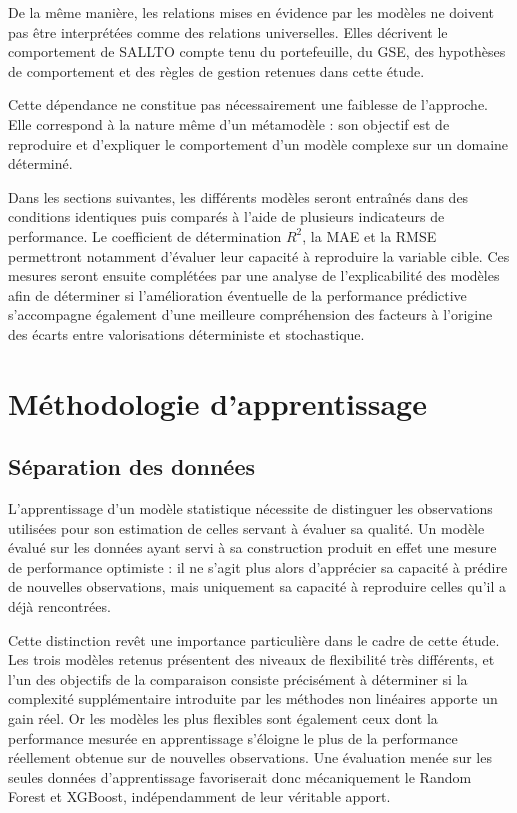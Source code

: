 De la même manière, les relations mises en évidence par les modèles ne doivent pas être interprétées comme des relations universelles. Elles décrivent le comportement de SALLTO compte tenu du portefeuille, du GSE, des hypothèses de comportement et des règles de gestion retenues dans cette étude.

Cette dépendance ne constitue pas nécessairement une faiblesse de l'approche. Elle correspond à la nature même d'un métamodèle : son objectif est de reproduire et d'expliquer le comportement d'un modèle complexe sur un domaine déterminé.

Dans les sections suivantes, les différents modèles seront entraînés dans des conditions identiques puis comparés à l'aide de plusieurs indicateurs de performance. Le coefficient de détermination $R^2$, la MAE et la RMSE permettront notamment d'évaluer leur capacité à reproduire la variable cible. Ces mesures seront ensuite complétées par une analyse de l'explicabilité des modèles afin de déterminer si l'amélioration éventuelle de la performance prédictive s'accompagne également d'une meilleure compréhension des facteurs à l'origine des écarts entre valorisations déterministe et stochastique.

\section{Méthodologie d'apprentissage}


\subsection{Séparation des données}

L'apprentissage d'un modèle statistique nécessite de distinguer les observations utilisées pour son estimation de celles servant à évaluer sa qualité. Un modèle évalué sur les données ayant servi à sa construction produit en effet une mesure de performance optimiste : il ne s'agit plus alors d'apprécier sa capacité à prédire de nouvelles observations, mais uniquement sa capacité à reproduire celles qu'il a déjà rencontrées.

Cette distinction revêt une importance particulière dans le cadre de cette étude. Les trois modèles retenus présentent des niveaux de flexibilité très différents, et l'un des objectifs de la comparaison consiste précisément à déterminer si la complexité supplémentaire introduite par les méthodes non linéaires apporte un gain réel. Or les modèles les plus flexibles sont également ceux dont la performance mesurée en apprentissage s'éloigne le plus de la performance réellement obtenue sur de nouvelles observations. Une évaluation menée sur les seules données d'apprentissage favoriserait donc mécaniquement le Random Forest et XGBoost, indépendamment de leur véritable apport.

